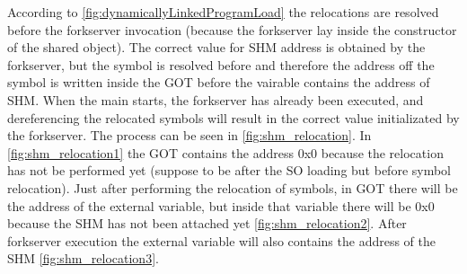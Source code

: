 According to \cref{fig:dynamicallyLinkedProgramLoad} the relocations are resolved before the forkserver invocation (because the 
forkserver lay inside the constructor of the shared object).
The correct value for \gls{SHM} address is obtained by the forkserver, but the symbol is resolved before and therefore 
the address off the symbol is written inside the \gls{GOT} before the vairable contains the address of \gls{SHM}.
When the main starts, the forkserver has already been executed, and dereferencing the relocated symbols will result 
in the correct value initializated by the forkserver.
The process can be seen in \cref{fig:shm_relocation}.
In \cref{fig:shm_relocation1} the \gls{GOT} contains the address 0x0 because the relocation has not be performed yet 
(suppose to be after the \gls{SO} loading but before symbol relocation).
Just after performing the relocation of symbols, in \gls{GOT} there will be the address of the external variable, 
but inside that variable there will be 0x0 because the \gls{SHM} has not been attached yet \cref{fig:shm_relocation2}.
After forkserver execution the external variable will also contains the address of the \gls{SHM} \cref{fig:shm_relocation3}.